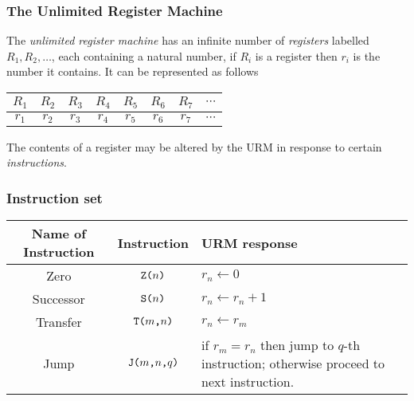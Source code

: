 \subsubsection*{The Unlimited Register Machine}
The \emph{unlimited register machine} has an infinite number of \emph{registers} labelled $R_1, R_2, \ldots$, each containing a natural number, if $R_i$ is a register then $r_i$ is the number it contains. It can be represented as follows

\begin{center}
	\begin{tabular}{|c|c|c|c|c|c|c|c}
		\hline
		$R_1$ & $R_2$ & $R_3$ & $R_4$ & $R_5$ & $R_6$ & $R_7$ & $\cdots$\\ 
		\hline
		$r_1$ & $r_2$ & $r_3$ & $r_4$ & $r_5$ & $r_6$ & $r_7$ & $\cdots$  \\
		\hline
	\end{tabular}
\end{center}
The contents of a register may be altered by the URM in response to certain \emph{instructions}. 

\subsubsection*{Instruction set}
\begin{center}
	\begin{tabular}{|c|c|p{11cm}|}
	\hline 
	Name of  Instruction & Instruction & URM response \\
	\hline
	Zero & $\texttt{Z(} n \texttt{)}$ & $r_n \gets 0$ \\ 
	\hline
	Successor & $\texttt{S(} n \texttt{)}$ & $r_n \gets r_n + 1$ \\
	\hline
	Transfer & $\texttt{T(} m \texttt{,} n \texttt{)}$ & $r_n \gets r_m $ \\
	\hline
	Jump & $\texttt{J(} m\texttt{,} n \texttt{,} q \texttt{)}$ & if $r_m = r_n$ then jump to $q$-th instruction; otherwise proceed to next instruction. \\
	\hline
\end{tabular}
\end{center}


